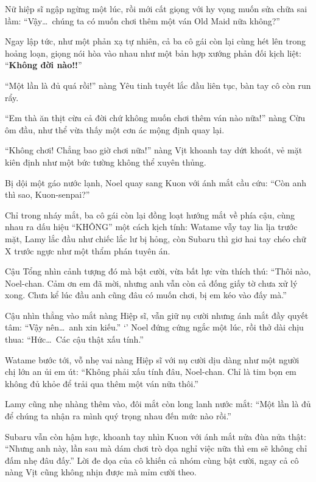 \documentclass[../main.tex]{subfiles}
\begin{document}
Nữ hiệp sĩ ngập ngừng một lúc, rồi mới cất giọng với hy vọng muốn sửa chữa sai lầm: ``Vậy\dots\ chúng ta có muốn chơi thêm một ván Old Maid nữa không?''

Ngay lập tức, như một phản xạ tự nhiên, cả ba cô gái còn lại cùng hét lên trong hoảng loạn, giọng nói hòa vào nhau như một bản hợp xướng phản đối kịch liệt: ``\textbf{Không đời nào!!}''

``Một lần là đủ quá rồi!'' nàng Yêu tinh tuyết lắc đầu liên tục, bàn tay cô còn run rẩy.

``Em thà ăn thịt cừu cả đời chứ không muốn chơi thêm ván nào nữa!'' nàng Cừu ôm đầu, như thể vừa thấy một cơn ác mộng định quay lại.

``Không chơi! Chẳng bao giờ chơi nữa!'' nàng Vịt khoanh tay dứt khoát, vẻ mặt kiên định như một bức tường không thể xuyên thủng.

Bị dội một gáo nước lạnh, Noel quay sang Kuon với ánh mắt cầu cứu: ``Còn anh thì sao, Kuon-senpai?''

Chỉ trong nháy mắt, ba cô gái còn lại đồng loạt hướng mắt về phía cậu, cùng nhau ra dấu hiệu ``KHÔNG'' một cách kịch tính: Watame vẫy tay lia lịa trước mặt, Lamy lắc đầu như chiếc lắc lư bị hỏng, còn Subaru thì giơ hai tay chéo chữ X trước ngực như một thẩm phán tuyên án.

Cậu Tổng nhìn cảnh tượng đó mà bật cười, vừa bất lực vừa thích thú: ``Thôi nào, Noel-chan. Cảm ơn em đã mời, nhưng anh vẫn còn cả đống giấy tờ chưa xử lý xong. Chưa kể lúc đầu anh cũng đâu có muốn chơi, bị em kéo vào đấy mà.''

Cậu nhìn thẳng vào mắt nàng Hiệp sĩ, vẫn giữ nụ cười nhưng ánh mắt đầy quyết tâm: ``Vậy nên\dots\ anh xin kiếu.''
`'
Noel đứng cứng ngắc một lúc, rồi thở dài chịu thua: ``Hức\dots\ Các cậu thật xấu tính.''

Watame bước tới, vỗ nhẹ vai nàng Hiệp sĩ với nụ cười dịu dàng như một người chị lớn an ủi em út: ``Không phải xấu tính đâu, Noel-chan. Chỉ là tim bọn em không đủ khỏe để trải qua thêm một ván nữa thôi.''

Lamy cũng nhẹ nhàng thêm vào, đôi mắt còn long lanh nước mắt: ``Một lần là đủ để chúng ta nhận ra mình quý trọng nhau đến mức nào rồi.''

Subaru vẫn còn hậm hực, khoanh tay nhìn Kuon với ánh mắt nửa đùa nửa thật: ``Nhưng anh này, lần sau mà dám chơi trò dọa nghỉ việc nữa thì em sẽ không chỉ đấm nhẹ đâu đấy.'' Lời đe dọa của cô khiến cả nhóm cùng bật cười, ngay cả cô nàng Vịt cũng không nhịn được mà mỉm cười theo.
\end{document}
